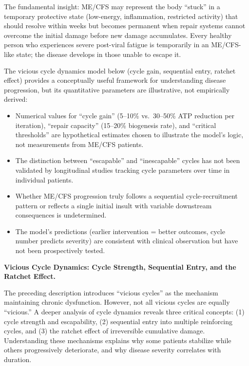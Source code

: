 The fundamental insight: ME/CFS may represent the body ``stuck'' in a temporary protective state (low-energy, inflammation, restricted activity) that should resolve within weeks but becomes permanent when repair systems cannot overcome the initial damage before new damage accumulates. Every healthy person who experiences severe post-viral fatigue is temporarily in an ME/CFS-like state; the disease develops in those unable to escape it.

\begin{limitation}
The vicious cycle dynamics model below (cycle gain, sequential entry, ratchet effect) provides a conceptually useful framework for understanding disease progression, but its quantitative parameters are illustrative, not empirically derived:
\begin{itemize}
    \item Numerical values for ``cycle gain'' (5--10\% vs.\ 30--50\% ATP reduction per iteration), ``repair capacity'' (15--20\% biogenesis rate), and ``critical thresholds'' are hypothetical estimates chosen to illustrate the model's logic, not measurements from ME/CFS patients.
    \item The distinction between ``escapable'' and ``inescapable'' cycles has not been validated by longitudinal studies tracking cycle parameters over time in individual patients.
    \item Whether ME/CFS progression truly follows a sequential cycle-recruitment pattern or reflects a single initial insult with variable downstream consequences is undetermined.
    \item The model's predictions (earlier intervention = better outcomes, cycle number predicts severity) are consistent with clinical observation but have not been prospectively tested.
\end{itemize}
\end{limitation}

\textbf{Vicious Cycle Dynamics: Cycle Strength, Sequential Entry, and the Ratchet Effect.}

The preceding description introduces ``vicious cycles'' as the mechanism maintaining chronic dysfunction. However, not all vicious cycles are equally ``vicious.'' A deeper analysis of cycle dynamics reveals three critical concepts: (1) cycle strength and escapability, (2) sequential entry into multiple reinforcing cycles, and (3) the ratchet effect of irreversible cumulative damage. Understanding these mechanisms explains why some patients stabilize while others progressively deteriorate, and why disease severity correlates with duration.

